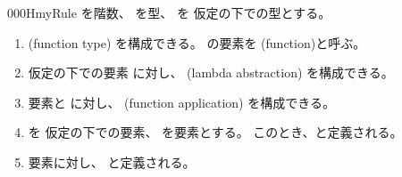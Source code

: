 \documentclass[index]{subfiles}
\begin{document}
\begin{myBlock}{000H}{myRule}
  を階数、
  を型、
  を
  仮定の下での型とする。
  \begin{enumerate}
  \item {}(function type)
    を構成できる。
    の要素を
    (function)と呼ぶ。
  \item 仮定の下での要素
    に対し、
    (lambda abstraction)
    を構成できる。
  \item 要素と
    に対し、
    (function application)
    を構成できる。
  \item {}を
    仮定の下での要素、
    を要素とする。
    このとき、と定義される。
  \item 要素に対し、
    と定義される。
  \end{enumerate}
\end{myBlock}
\end{document}
